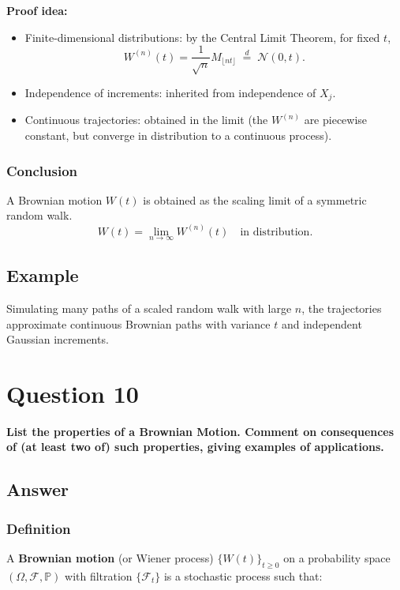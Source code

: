 \documentclass[12pt,a4paper]{book}
\theoremstyle{remark}
\newcommand{\PP}{\mathbb{P}}          %
\newcommand{\F}{\mathcal{F}}          %
\newcommand{\Normal}{\mathcal{N}}
\newcommand{\law}{\stackrel{d}{=}}    %
\begin{document}
\textbf{Proof idea:}
\begin{itemize}
    \item Finite-dimensional distributions: by the Central Limit Theorem, for fixed $t$, 
    \[
    W^{(n)}(t) = \frac{1}{\sqrt{n}}M_{\lfloor nt \rfloor} \;\law\; \Normal(0,t).
    \]
    \item Independence of increments: inherited from independence of $X_j$.
    \item Continuous trajectories: obtained in the limit (the $W^{(n)}$ are piecewise constant, but converge in distribution to a continuous process).
\end{itemize}

\subsubsection*{Conclusion}
A Brownian motion $W(t)$ is obtained as the scaling limit of a symmetric random walk.  
\[
W(t) = \lim_{n\to\infty} W^{(n)}(t) \quad \text{in distribution}.
\]

\subsection*{Example}
Simulating many paths of a scaled random walk with large $n$, the trajectories approximate continuous Brownian paths with variance $t$ and independent Gaussian increments.








\newpage
\section{Question 10}
\textbf{List the properties of a Brownian Motion. Comment on consequences of (at least two of) such properties, giving examples of applications.}

\subsection*{Answer}

\subsubsection*{Definition}
A \textbf{Brownian motion} (or Wiener process) $\{W(t)\}_{t\ge 0}$ on a probability space $(\Omega,\F,\PP)$ with filtration $\{\F_t\}$ is a stochastic process such that:
\end{document}
